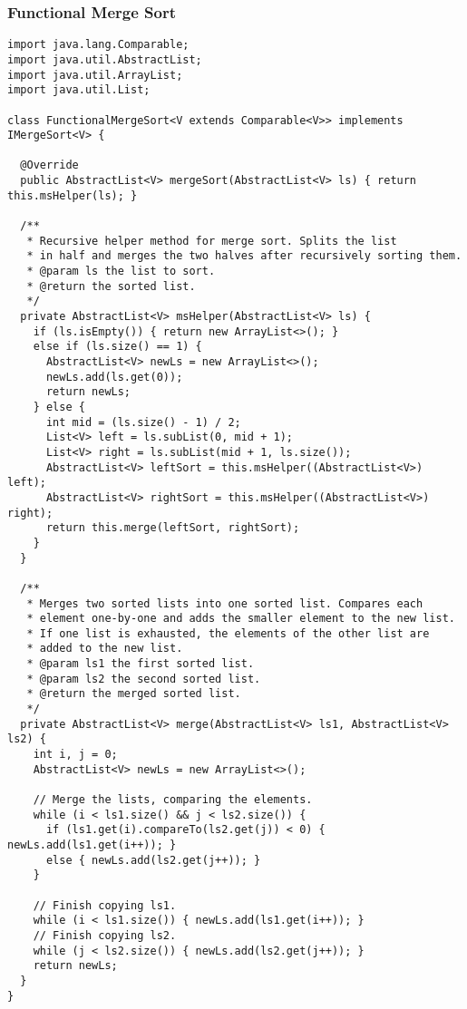 \subsubsection*{Functional Merge Sort}
\begin{lstlisting}[language=MyJava]
import java.lang.Comparable;
import java.util.AbstractList;
import java.util.ArrayList;
import java.util.List;
  
class FunctionalMergeSort<V extends Comparable<V>> implements IMergeSort<V> {
  
  @Override
  public AbstractList<V> mergeSort(AbstractList<V> ls) { return this.msHelper(ls); }
  
  /**
   * Recursive helper method for merge sort. Splits the list 
   * in half and merges the two halves after recursively sorting them.
   * @param ls the list to sort.
   * @return the sorted list.
   */
  private AbstractList<V> msHelper(AbstractList<V> ls) {
    if (ls.isEmpty()) { return new ArrayList<>(); } 
    else if (ls.size() == 1) {
      AbstractList<V> newLs = new ArrayList<>();
      newLs.add(ls.get(0));
      return newLs;
    } else {
      int mid = (ls.size() - 1) / 2;
      List<V> left = ls.subList(0, mid + 1);
      List<V> right = ls.subList(mid + 1, ls.size());
      AbstractList<V> leftSort = this.msHelper((AbstractList<V>) left);
      AbstractList<V> rightSort = this.msHelper((AbstractList<V>) right);
      return this.merge(leftSort, rightSort);
    }
  }
  
  /**
   * Merges two sorted lists into one sorted list. Compares each 
   * element one-by-one and adds the smaller element to the new list. 
   * If one list is exhausted, the elements of the other list are
   * added to the new list.
   * @param ls1 the first sorted list.
   * @param ls2 the second sorted list.
   * @return the merged sorted list.
   */
  private AbstractList<V> merge(AbstractList<V> ls1, AbstractList<V> ls2) {
    int i, j = 0;
    AbstractList<V> newLs = new ArrayList<>();
          
    // Merge the lists, comparing the elements.
    while (i < ls1.size() && j < ls2.size()) {
      if (ls1.get(i).compareTo(ls2.get(j)) < 0) { newLs.add(ls1.get(i++)); } 
      else { newLs.add(ls2.get(j++)); }
    }
  
    // Finish copying ls1.
    while (i < ls1.size()) { newLs.add(ls1.get(i++)); }
    // Finish copying ls2.
    while (j < ls2.size()) { newLs.add(ls2.get(j++)); }
    return newLs;
  }
}
\end{lstlisting}

